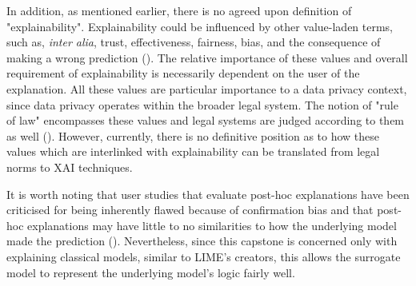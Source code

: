 In addition, as mentioned earlier, there is no agreed upon definition of "explainability". Explainability could be influenced by other value-laden terms, such as, \textit{inter alia}, trust, effectiveness, fairness, bias, and the consequence of making a wrong prediction (\cite{rosenfeld2021}). The relative importance of these values and overall requirement of explainability is necessarily dependent on the user of the explanation. All these values are particular importance to a data privacy context, since data privacy operates within the broader legal system. The notion of "rule of law" encompasses these values and legal systems are judged according to them as well (\cite{greenstein2022}). However, currently, there is no definitive position as to how these values which are interlinked with explainability can be translated from legal norms to XAI techniques.

It is worth noting that user studies that evaluate post-hoc explanations have been criticised for being inherently flawed because of confirmation bias and that post-hoc explanations may have little to no similarities to how the underlying model made the prediction (\cite{rosenfeld2021}). Nevertheless, since this capstone is concerned only with explaining classical models, similar to LIME's creators, this allows the surrogate model to represent the underlying model's logic fairly well. 


